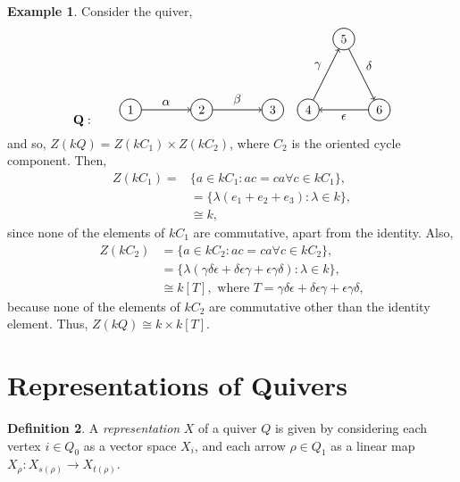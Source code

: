\documentclass[11.5pt, twoside, a4paper, titlepage]{report}
\providecommand{\equ}[0]{\begin{equation*}}
\providecommand{\eequ}[0] {\end{equation*}}
\theoremstyle{definition}
\newtheorem{mydef}{Definition}[section]
\newtheorem{eg}[mydef]{Example}
\theoremstyle{plain}
\begin{document}
\begin{eg}
Consider the quiver, 
\equ
\mathbf{Q}: \qquad
\begin{tikzpicture}[->,-latex, auto, every path/.style={->, semithick}, main node/.style={draw, circle}]
\node	[main node]		(1) at (0,0)		{1};
\node [main node]		(2) at (2,0)		{2};
\node [main node]		(3) at (4,0)		{3};
\node [main node]		(4) at (5,0)		{4};
\node [main node]		(5) at (6,2)		{5};
\node [main node]		(6) at (7, 0)		{6};

\draw (1) edge node [auto] {$\alpha$} (2);
\draw (2) edge node [auto] {$\beta$} (3);
\draw (4) edge node [auto] {$\gamma$} (5);
\draw (5) edge node [auto] {$\delta$} (6);
\draw (6) edge node [auto] {$\epsilon$} (4);
\end{tikzpicture}
\eequ
and so, $Z(kQ)=Z(kC_1) \times Z(kC_2)$, where $C_2$ is the oriented cycle component. Then, 
\begin{align*}
Z(kC_1)=&\{a \in kC_1: ac=ca \forall c\in kC_1\}, \\
&=\{\lambda(e_1+e_2+e_3): \lambda\in k\}, \\
&\cong k,
\end{align*}
since none of the elements of $kC_1$ are commutative, apart from the identity. Also, 
\begin{align*}
Z(kC_2) &=\{a \in kC_2: ac=ca \forall c\in kC_2\},\\
&=\{\lambda(\gamma\delta\epsilon + \delta\epsilon\gamma +\epsilon\gamma\delta): \lambda \in k\}, \\
&\cong k[T], \text{ where }T=\gamma\delta\epsilon + \delta\epsilon\gamma +\epsilon\gamma\delta, 
\end{align*}
because none of the elements of $kC_2$ are commutative other than the identity element. Thus, $Z(kQ)\cong k \times k[T]$.
\end{eg}

\section{Representations of Quivers}

\begin{mydef}
A \emph{representation} $X$ of a quiver $Q$ is given by considering each vertex $i\in Q_0$ as a vector space $X_i$, and each arrow $\rho \in Q_1$ as a linear map $X_\rho: X_{s(\rho)} \to X_{t(\rho)}$.
\end{mydef}
\end{document}
